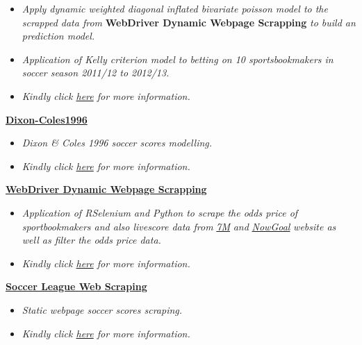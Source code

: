 \documentclass[]{article}
\providecommand{\tightlist}{%
  \setlength{\itemsep}{0pt}\setlength{\parskip}{0pt}}
\begin{document}
\begin{itemize}
\tightlist
\item
  \emph{Apply dynamic weighted diagonal inflated bivariate poisson model
  to the scrapped data from} \textbf{WebDriver Dynamic Webpage
  Scrapping} \emph{to build an prediction model.}
\item
  \emph{Application of Kelly criterion model to betting on 10
  sportsbookmakers in soccer season 2011/12 to 2012/13.}
\item
  \emph{Kindly click
  \href{https://github.com/Scibrokes/kelly-criterion}{here} for more
  information.}
\end{itemize}

\href{https://github.com/Scibrokes/Dixon-Coles1996}{\textbf{Dixon-Coles1996}}

\begin{itemize}
\tightlist
\item
  \emph{Dixon \& Coles 1996 soccer scores modelling.}
\item
  \emph{Kindly click
  \href{https://github.com/Scibrokes/Dixon-Coles1996}{here} for more
  information.}
\end{itemize}

\href{https://github.com/Scibrokes/WebDriver-DynamicWebpage-Scrapping}{\textbf{WebDriver
Dynamic Webpage Scrapping}}

\begin{itemize}
\tightlist
\item
  \emph{Application of RSelenium and Python to scrape the odds price of
  sportbookmakers and also livescore data from}
  \href{http://odds.7m.hk/en/}{\emph{7M}} \emph{and}
  \href{http://info.nowgoal.com/en/}{\emph{NowGoal}} \emph{website as
  well as filter the odds price data.}
\item
  \emph{Kindly click
  \href{https://github.com/Scibrokes/WebDriver-DynamicWebpage-Scrapping}{here}
  for more information.}
\end{itemize}

\href{https://github.com/Scibrokes/Soccer-League-Web-Scraping}{\textbf{Soccer
League Web Scraping}}

\begin{itemize}
\tightlist
\item
  \emph{Static webpage soccer scores scraping.}
\item
  \emph{Kindly click
  \href{https://github.com/Scibrokes/Soccer-League-Web-Scraping}{here}
  for more information.}
\end{itemize}
\end{document}
